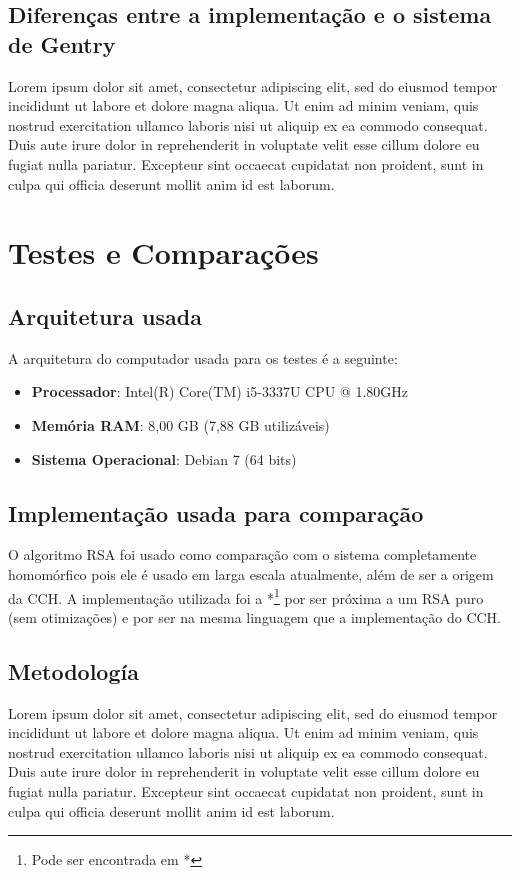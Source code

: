 	\subsection{Diferenças entre a implementação e o sistema de Gentry}
	Lorem ipsum dolor sit amet, consectetur adipiscing elit, sed do eiusmod tempor incididunt ut labore et dolore magna aliqua. Ut enim ad minim veniam, quis nostrud exercitation ullamco laboris nisi ut aliquip ex ea commodo consequat. Duis aute irure dolor in reprehenderit in voluptate velit esse cillum dolore eu fugiat nulla pariatur. Excepteur sint occaecat cupidatat non proident, sunt in culpa qui officia deserunt mollit anim id est laborum.

\newpage

\section{Testes e Comparações}\label{sec:LABEL_CHP_1_SEC_G}

	\subsection{Arquitetura usada}
	A arquitetura do computador usada para os testes é a seguinte:
	\begin{itemize}
		\item \textbf{Processador}: Intel(R) Core(TM) i5-3337U CPU @ 1.80GHz
		\item \textbf{Memória RAM}: 8,00 GB (7,88 GB utilizáveis)
		\item \textbf{Sistema Operacional}: Debian 7 (64 bits)
	\end{itemize}

	\subsection{Implementação usada para comparação}
	O algoritmo RSA foi usado como comparação com o sistema completamente homomórfico pois ele é usado em larga escala atualmente, além de ser a origem da CCH. A implementação utilizada foi a *\footnote{Pode ser encontrada em *} por ser próxima a um RSA puro (sem otimizações) e por ser na mesma linguagem que a implementação do CCH.
	
	\subsection{Metodología}
	Lorem ipsum dolor sit amet, consectetur adipiscing elit, sed do eiusmod tempor incididunt ut labore et dolore magna aliqua. Ut enim ad minim veniam, quis nostrud exercitation ullamco laboris nisi ut aliquip ex ea commodo consequat. Duis aute irure dolor in reprehenderit in voluptate velit esse cillum dolore eu fugiat nulla pariatur. Excepteur sint occaecat cupidatat non proident, sunt in culpa qui officia deserunt mollit anim id est laborum.
	
